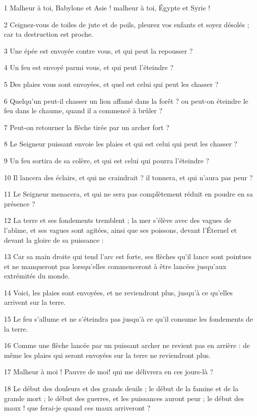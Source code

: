 
\par 1 Malheur à toi, Babylone et Asie ! malheur à toi, Égypte et Syrie !
\par 2 Ceignez-vous de toiles de jute et de poils, pleurez vos enfants et soyez désolés ; car ta destruction est proche.
\par 3 Une épée est envoyée contre vous, et qui peut la repousser ?
\par 4 Un feu est envoyé parmi vous, et qui peut l'éteindre ?
\par 5 Des plaies vous sont envoyées, et quel est celui qui peut les chasser ?
\par 6 Quelqu'un peut-il chasser un lion affamé dans la forêt ? ou peut-on éteindre le feu dans le chaume, quand il a commencé à brûler ?
\par 7 Peut-on retourner la flèche tirée par un archer fort ?
\par 8 Le Seigneur puissant envoie les plaies et qui est celui qui peut les chasser ?
\par 9 Un feu sortira de sa colère, et qui est celui qui pourra l'éteindre ?
\par 10 Il lancera des éclairs, et qui ne craindrait ? il tonnera, et qui n'aura pas peur ?
\par 11 Le Seigneur menacera, et qui ne sera pas complètement réduit en poudre en sa présence ?
\par 12 La terre et ses fondements tremblent ; la mer s'élève avec des vagues de l'abîme, et ses vagues sont agitées, ainsi que ses poissons, devant l'Éternel et devant la gloire de sa puissance :
\par 13 Car sa main droite qui tend l'arc est forte, ses flèches qu'il lance sont pointues et ne manqueront pas lorsqu'elles commenceront à être lancées jusqu'aux extrémités du monde.
\par 14 Voici, les plaies sont envoyées, et ne reviendront plus, jusqu'à ce qu'elles arrivent sur la terre.
\par 15 Le feu s'allume et ne s'éteindra pas jusqu'à ce qu'il consume les fondements de la terre.
\par 16 Comme une flèche lancée par un puissant archer ne revient pas en arrière : de même les plaies qui seront envoyées sur la terre ne reviendront plus.
\par 17 Malheur à moi ! Pauvre de moi! qui me délivrera en ces jours-là ?
\par 18 Le début des douleurs et des grands deuils ; le début de la famine et de la grande mort ; le début des guerres, et les puissances auront peur ; le début des maux ! que ferai-je quand ces maux arriveront ?

